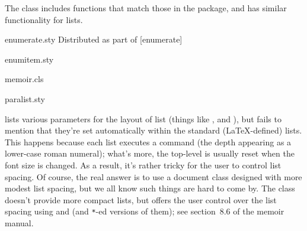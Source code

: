 The  class includes functions that match those in the
 package, and has similar functionality for
 lists.
\begin{ctanrefs}
\item[enumerate.sty]Distributed as part of [enumerate]
\item[enumitem.sty]
\item[memoir.cls]
\item[paralist.sty]
\end{ctanrefs}


 lists various
parameters for the layout of list (things like ,
 and ), but fails to mention that they're set
automatically within the standard (\LaTeX{}-defined) lists.  This
happens because each list
executes a command \texttt{} (the depth
appearing as a lower-case roman numeral); what's more, the top-level
 is usually reset when the font size is changed.  As a
result, it's rather tricky for 
the user to control list spacing.  Of course, the real answer is to use
a document class designed with more modest list spacing, but we all
know such things are hard to come by.  The  class doesn't
provide more compact lists, but offers the user control over the list
spacing using  and  (and \texttt{*}-ed
versions of them); see section~8.6 of the memoir manual.


